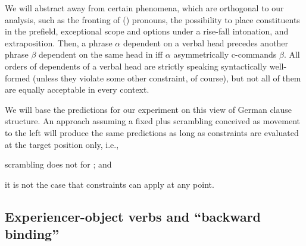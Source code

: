 \documentclass[output=paper,colorlinks,citecolor=brown]{langscibook}
\begin{document}
We will abstract away from certain phenomena, which are orthogonal to our analysis, such as the fronting of () pronouns, the possibility to place constituents in the prefield, exceptional scope and  options under a rise-fall intonation, and extraposition.
Then, a phrase $\alpha$ dependent on a verbal head precedes another phrase $\beta$ dependent on the same head in  iff $\alpha$ asymmetrically c-commands $\beta$.
All orders of dependents of a verbal head are strictly speaking syntactically well-formed (unless they violate some other constraint, of course), but not all of them are equally acceptable in every context.

We will base the predictions for our experiment on this view of German clause structure. 
An approach assuming a fixed  plus scrambling conceived as movement to the left \parencite[as e.g. in][]{haider_mittelfeld_2017} will produce the same predictions as long as  constraints are evaluated at the target position only, i.e.,
\begin{inparaenum}[i)]
    \item scrambling does not  for  ; and
    \item it is not the case that  constraints can apply at any point.
\end{inparaenum}
 

\subsection{Experiencer-object verbs and \enquote{backward binding}}
\label{sec:log_bind_German:Masloch}
\end{document}

